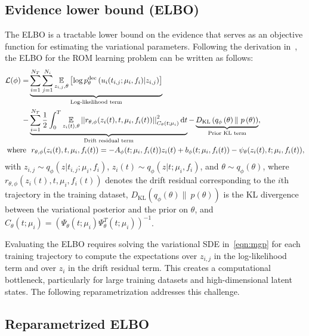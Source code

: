 \documentclass{article}
\begin{document}
	\subsection{Evidence lower bound (ELBO)} \label{sec:elbo}
	
	The ELBO is a tractable lower bound on the evidence that serves as an objective function for estimating the variational parameters. Following the derivation in~\cite{Archambeau_2007_Variational_Inference_Diffusion, Course_2023_State_Estimation}, the ELBO for the ROM learning problem can be written as follows:
	\begin{align}\label{eqn:orig_elbo}
		\mathcal{L}(\phi) = & \underbrace{\sum_{i=1}^{N_T} \sum_{j=1}^{N_i} 
			\underset{ z_{i,j}, \theta }{\mathbb{E}}
			\left [ \log p_{\theta}^{\rm dec} \left ( u_{i}(t_{i,j};  \mu_i, f_i) | z_{i,j} \right )  \right ]}_{\text{Log-likelihood term}}\nonumber \\
		- & \underbrace{\sum_{i=1}^{N_T}\frac{1}{2} \int_0^{T} 
			\underset{z_i(t), \theta}{\mathbb{E}}
			\left | \left | r_{\theta, \phi} (z_i(t), t, \mu_i, f_i(t)) \right | \right |_{C_{\theta}(t;\mu_i)}^2 \text{d}t}_{\text{Drift residual term}}
		- \underbrace{D_{\textrm{KL}}\left(q_\phi\left(\theta\right) \|\ p\left(\theta\right)\right)}_{\text{Prior KL term}}, \\
		\textrm{where}\ &\ r_{\theta, \phi}(z_i(t), t, \mu_i, f_i(t)) = -A_\phi (t; \mu_i, f_i(t)) z_i(t) + b_\phi (t; \mu_i, f_i(t)) - \psi_\theta (z_i(t), t; \mu_i, f_i(t)),\nonumber
	\end{align}
	with $z_{i,j} \sim q_\phi(z | t_{i,j}; \mu_i, f_{i})$, $z_i(t) \sim q_\phi(z | t; \mu_i, f_i)$, and $\theta \sim q_\phi(\theta)$, where $r_{\theta, \phi}(z_i(t), t, \mu_i, f_i(t))$ denotes the drift residual corresponding to the $i$th trajectory in the training dataset, $D_{\textrm{KL}}\left(q_\phi\left(\theta\right) \|\ p\left(\theta\right)\right)$ is the KL divergence between the variational posterior and the prior on $\theta$, and $C_{\theta}(t;\mu_i) = (\Psi_\theta(t;\mu_i) \Psi^T_\theta(t;\mu_i))^{-1}$.
	
	
	Evaluating the ELBO requires solving the variational SDE in~\eqref{eqn:mgp} for each training trajectory to compute the expectations over $z_{i,j}$
	in the log-likelihood term and over $z_i$ in the drift residual term. This creates a computational bottleneck, particularly for large training datasets and high-dimensional latent states. The following reparametrization addresses this challenge.
	
	\subsection{Reparametrized ELBO} \label{sec:reparam}
	
\end{document}
